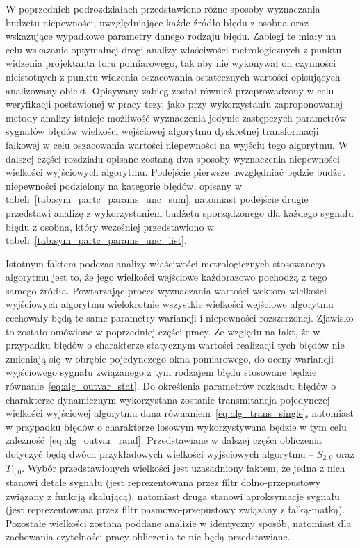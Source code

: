 W poprzednich podrozdziałach przedstawiono różne sposoby wyznaczania budżetu niepewności, uwzględniające każde źródło błędu z osobna oraz wskazujące wypadkowe parametry danego rodzaju błędu. Zabiegi te miały na celu wskazanie optymalnej drogi analizy właściwości metrologicznych z punktu widzenia projektanta toru pomiarowego, tak aby nie wykonywał on czynności nieistotnych z punktu widzenia oszacowania ostatecznych wartości opisujących analizowany obiekt. Opisywany zabieg został również przeprowadzony w celu weryfikacji postawionej w pracy tezy, jako przy wykorzystaniu zaproponowanej metody analizy istnieje możliwość wyznaczenia jedynie zastępczych parametrów sygnałów błędów wielkości wejściowej algorytmu dyskretnej transformacji falkowej w celu oszacowania wartości niepewności na wyjściu tego algorytmu. W dalszej części rozdziału opisane zostaną dwa sposoby wyznaczenia niepewności wielkości wyjściowych algorytmu. Podejście pierwsze uwzględniać będzie budżet niepewności podzielony na kategorie błędów, opisany w tabeli~\ref{tab:sym_partc_params_unc_sum}, natomiast podejście drugie przedstawi analizę z wykorzystaniem budżetu sporządzonego dla każdego sygnału błędu z osobna, który wcześniej przedstawiono w tabeli~\ref{tab:sym_partc_params_unc_list}.

Istotnym faktem podczas analizy właściwości metrologicznych stosowanego algorytmu jest to, że jego wielkości wejściowe każdorazowo pochodzą z tego samego źródła. Powtarzając proces wyznaczania wartości wektora wielkości wyjściowych algorytmu wielokrotnie wszystkie wielkości wejściowe algorytmu cechowały będą te same parametry wariancji i niepewności rozszerzonej. Zjawisko to zostało omówione w poprzedniej części pracy. Ze względu na fakt, że w przypadku błędów o charakterze statycznym wartości realizacji tych błędów nie zmieniają się w obrębie pojedynczego okna pomiarowego, do oceny wariancji wyjściowego sygnału związanego z tym rodzajem błędu stosowane będzie równanie~\eqref{eq:alg_outvar_stat}. Do określenia parametrów rozkładu błędów o charakterze dynamicznym wykorzystana zostanie transmitancja pojedynczej wielkości wyjściowej algorytmu dana równaniem~\eqref{eq:alg_trans_single}, natomiast w przypadku błędów o charakterze losowym wykorzystywana będzie w tym celu zależność~\eqref{eq:alg_outvar_rand}.
Przedstawiane w dalszej części obliczenia dotyczyć będą dwóch przykładowych wielkości wyjściowych algorytmu -- $S_{2,0}$ oraz $T_{1,0}$. Wybór przedstawionych wielkości jest uzasadniony faktem, że jedna z nich stanowi detale sygnału (jest reprezentowana przez filtr dolno-przepustowy związany z funkcją skalującą), natomiast druga stanowi aproksymacje sygnału (jest reprezentowana przez filtr pasmowo-przepustowy związany z falką-matką). Pozostałe wielkości zostaną poddane analizie w identyczny sposób, natomiast dla zachowania czytelności pracy obliczenia te nie będą przedstawiane.

